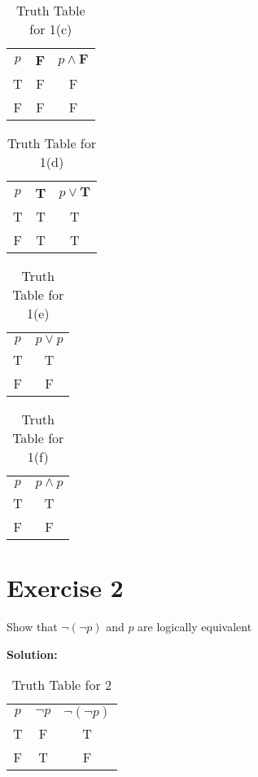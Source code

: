 \documentclass{Axon}
\begin{document}
\begin{table}[h]
    \centering
    \begin{tabular}{c|c|c}
        \(p\) & \textbf{F} & \(p \land \textbf{F}\) \\
        T     & F          & F                      \\
        F     & F          & F
    \end{tabular}
    \caption{Truth Table for 1(c)}
\end{table}

\begin{table}[ht]
    \centering
    \begin{tabular}{c|c|c}
        \(p\) & \textbf{T} & \(p \lor \textbf{T}\) \\
        T     & T          & T                     \\
        F     & T          & T
    \end{tabular}
    \caption{Truth Table for 1(d)}
\end{table}

\begin{table}[ht]
    \centering
    \begin{tabular}{c|c}
        \(p\) & \(p \lor p\) \\
        T     & T            \\
        F     & F
    \end{tabular}
    \caption{Truth Table for 1(e)}
\end{table}

\begin{table}[ht]
    \centering
    \begin{tabular}{c|c}
        \(p\) & \(p \land p\) \\
        T     & T             \\
        F     & F
    \end{tabular}
    \caption{Truth Table for 1(f)}
\end{table}

\section*{Exercise 2}
Show that \(\lnot(\lnot p)\) and \(p\) are logically equivalent

\noindent
\textbf{Solution:}
\begin{table}[ht]
    \centering
    \begin{tabular}{c|c|c}
        \(p\) & \(\lnot p\) & \(\lnot(\lnot p)\) \\
        T     & F           & T                  \\
        F     & T           & F
    \end{tabular}
    \caption{Truth Table for 2}
\end{table}
\end{document}
